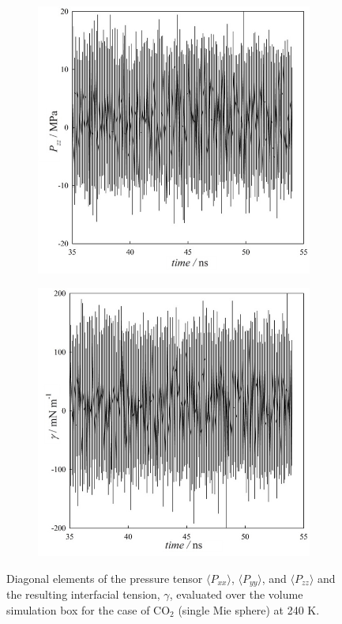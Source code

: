 \documentclass[9pt,tutorial]{livecoms}
\begin{document}
\begin{figure}
\begin{subfigure}{0.45\linewidth}
	\end{subfigure}
	\begin{subfigure}{0.45\linewidth} %
    \includegraphics[width=1\textwidth]{gfx/fig_15_c.jpeg}
	\end{subfigure}
	\begin{subfigure}{0.45\linewidth} %
    \includegraphics[width=1\textwidth]{gfx/fig_15_d.jpeg}
	\end{subfigure}
\caption{Diagonal elements of the pressure tensor ${\langle}P_{xx}{\rangle}$, ${\langle}P_{yy}{\rangle}$, and ${\langle}P_{zz}{\rangle}$ and the resulting interfacial tension, ${\gamma}$, evaluated over the volume simulation box for the case of CO$_{2}$ (single Mie sphere) at 240 K.
}
\label{fig:16}
\end{figure}
\end{document}
